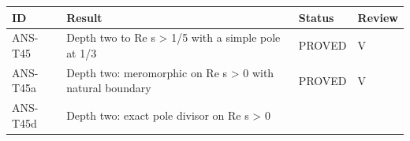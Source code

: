 \documentclass[
  11pt,
]{article}
\begin{document}
\begin{longtable}[]{@{}llll@{}}
\toprule
\begin{minipage}[b]{0.16\columnwidth}\raggedright
ID\strut
\end{minipage} & \begin{minipage}[b]{0.41\columnwidth}\raggedright
Result\strut
\end{minipage} & \begin{minipage}[b]{0.22\columnwidth}\raggedright
Status\strut
\end{minipage} & \begin{minipage}[b]{0.10\columnwidth}\raggedright
Review\strut
\end{minipage}\tabularnewline
\midrule
\endhead
\begin{minipage}[t]{0.16\columnwidth}\raggedright
ANS-T45\strut
\end{minipage} & \begin{minipage}[t]{0.41\columnwidth}\raggedright
Depth two to Re s \textgreater{} 1/5 with a simple pole at 1/3\strut
\end{minipage} & \begin{minipage}[t]{0.22\columnwidth}\raggedright
PROVED\strut
\end{minipage} & \begin{minipage}[t]{0.10\columnwidth}\raggedright
V\strut
\end{minipage}\tabularnewline
\begin{minipage}[t]{0.16\columnwidth}\raggedright
ANS-T45a\strut
\end{minipage} & \begin{minipage}[t]{0.41\columnwidth}\raggedright
Depth two: meromorphic on Re s \textgreater{} 0 with natural
boundary\strut
\end{minipage} & \begin{minipage}[t]{0.22\columnwidth}\raggedright
PROVED\strut
\end{minipage} & \begin{minipage}[t]{0.10\columnwidth}\raggedright
V\strut
\end{minipage}\tabularnewline
\begin{minipage}[t]{0.16\columnwidth}\raggedright
ANS-T45d\strut
\end{minipage} & \begin{minipage}[t]{0.41\columnwidth}\raggedright
Depth two: exact pole divisor on Re s \textgreater{} 0\strut
\end{minipage} & \begin{minipage}[t]{0.22\columnwidth}\raggedright

\end{minipage}
\end{longtable}
\end{document}
